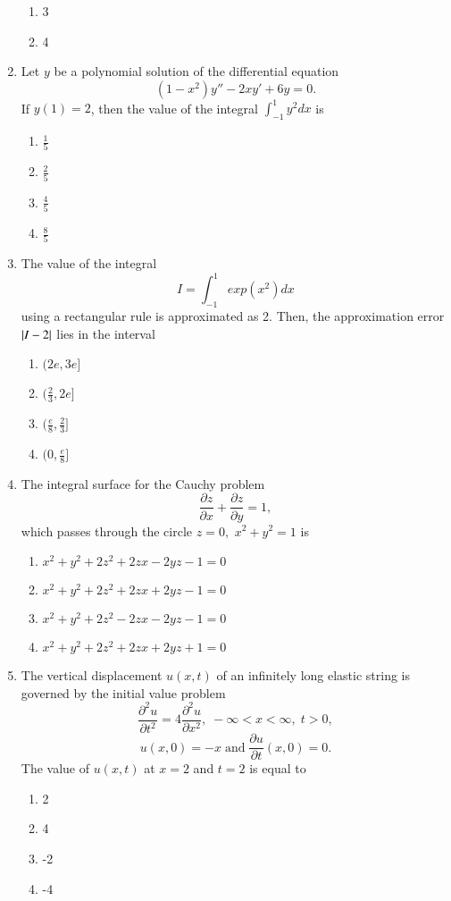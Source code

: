 \documentclass[journal,12pt,onecolumn]{IEEEtran}
\theoremstyle{remark}
\begin{document}
\begin{enumerate}[start=27]
\begin{enumerate}
    \item 3
    \item 4
\end{enumerate}
\item Let $y$ be a polynomial solution of the differential equation $$(1-x^2)y''-2xy'+6y=0.$$ If $y(1)=2$, then the value of the integral $\int_{-1}^{1}y^2dx$ is
\begin{enumerate}
    \item $\frac{1}{5}$
    \item $\frac{2}{5}$
    \item $\frac{4}{5}$
    \item $\frac{8}{5}$
\end{enumerate}
\item The value of the integral $$I=\int_{-1}^{1}exp(x^2)dx$$ using a rectangular rule is approximated as 2. Then, the approximation error $\left\vert I-2\right\vert$ lies in the interval
\begin{enumerate}
    \item $(2e,3e]$
    \item $(\frac{2}{3},2e]$
    \item $(\frac{e}{8},\frac{2}{3}]$
    \item $(0,\frac{e}{8}]$
\end{enumerate}
\item The integral surface for the Cauchy problem $$\frac{\partial z}{\partial x}+\frac{\partial z}{\partial y}=1,$$ which passes through the circle $z=0,$ $x^2+y^2=1$ is
\begin{enumerate}
    \item $x^2+y^2+2z^2+2zx-2yz-1=0$
    \item $x^2+y^2+2z^2+2zx+2yz-1=0$
    \item $x^2+y^2+2z^2-2zx-2yz-1=0$
    \item $x^2+y^2+2z^2+2zx+2yz+1=0$
\end{enumerate}
\item The vertical displacement $u(x,t)$ of an infinitely long elastic string is governed by the initial value problem $$\frac{\partial^2 u}{\partial t^2}=4\frac{\partial^2 u}{\partial x^2}, \; -\infty <x<\infty, \; t>0,$$ $$u(x,0)=-x \; \text{and} \; \frac{\partial{u}}{\partial{t}}(x,0)=0.$$ The value of $u(x,t)$ at $x=2$ and $t=2$ is equal to
\begin{enumerate}
    \item 2
    \item 4
    \item -2
    \item -4

\end{enumerate}
\end{enumerate}
\end{document}
